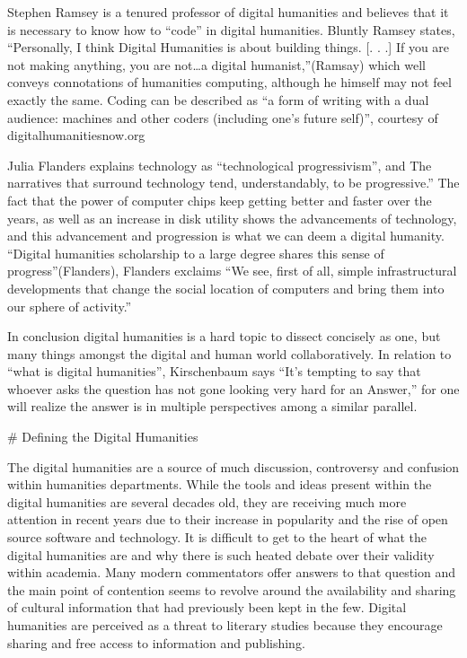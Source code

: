 \documentclass[]{article}
\begin{document}
Stephen Ramsey is a tenured professor of digital humanities and believes
that it is necessary to know how to ``code'' in digital humanities.
Bluntly Ramsey states, ``Personally, I think Digital Humanities is about
building things. {[}. . .{]} If you are not making anything, you are
not\ldots{}a digital humanist,''(Ramsay) which well conveys connotations
of humanities computing, although he himself may not feel exactly the
same. Coding can be described as ``a form of writing with a dual
audience: machines and other coders (including one's future self)'',
courtesy of digitalhumanitiesnow.org

Julia Flanders explains technology as ``technological progressivism'',
and The narratives that surround technology tend, understandably, to be
progressive.'' The fact that the power of computer chips keep getting
better and faster over the years, as well as an increase in disk utility
shows the advancements of technology, and this advancement and
progression is what we can deem a digital humanity. ``Digital humanities
scholarship to a large degree shares this sense of progress''(Flanders),
Flanders exclaims ``We see, first of all, simple infrastructural
developments that change the social location of computers and bring them
into our sphere of activity.''

In conclusion digital humanities is a hard topic to dissect concisely as
one, but many things amongst the digital and human world
collaboratively. In relation to ``what is digital humanities'',
Kirschenbaum says ``It's tempting to say that whoever asks the question
has not gone looking very hard for an Answer,'' for one will realize the
answer is in multiple perspectives among a similar parallel.

\# Defining the Digital Humanities

The digital humanities are a source of much discussion, controversy and
confusion within humanities departments. While the tools and ideas
present within the digital humanities are several decades old, they are
receiving much more attention in recent years due to their increase in
popularity and the rise of open source software and technology. It is
difficult to get to the heart of what the digital humanities are and why
there is such heated debate over their validity within academia. Many
modern commentators offer answers to that question and the main point of
contention seems to revolve around the availability and sharing of
cultural information that had previously been kept in the few. Digital
humanities are perceived as a threat to literary studies because they
encourage sharing and free access to information and publishing.
\end{document}
